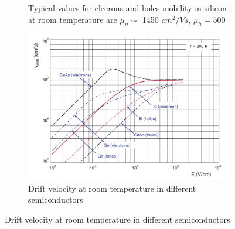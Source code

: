 \begin{titlepage}
\begin{figure}[h!]
\begin{subfigure}{.5\textwidth}
     \caption{Typical values for elecrons and holes mobility 
     in silicon at room temperature are $\mu _n \sim$ 1450 $cm^2/Vs$, $\mu _h = 500$}
     \label{fig:sfig1}
   \end{subfigure}%
   \begin{subfigure}{.5\textwidth}
     \centering
     \includegraphics[width=.8\linewidth]{figures/velocity_in_semiconductor.png}
     \caption{Drift velocity at room temperature in different semiconductors}
     \label{fig:sfig2}
   \end{subfigure}
   \label{fig:mobility_drift}
\end{figure}


\end{titlepage}
